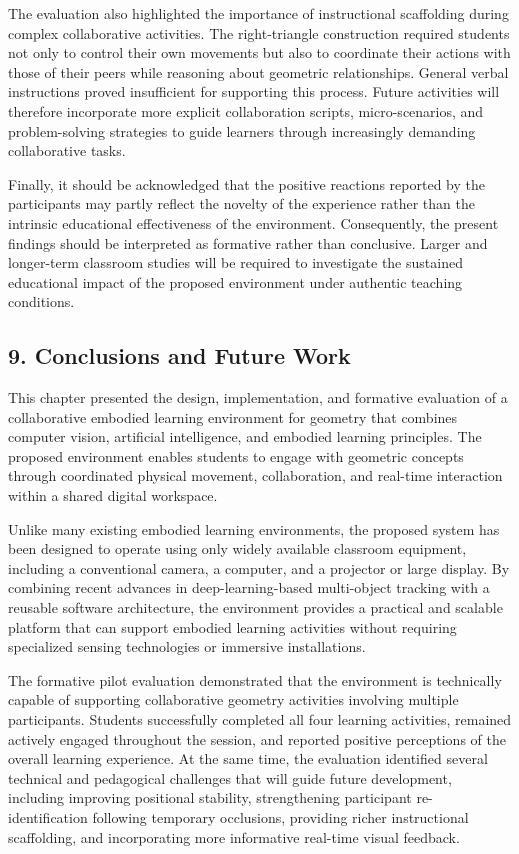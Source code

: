 The evaluation also highlighted the importance of instructional
scaffolding during complex collaborative activities. The right-triangle
construction required students not only to control their own movements
but also to coordinate their actions with those of their peers while
reasoning about geometric relationships. General verbal instructions
proved insufficient for supporting this process. Future activities will
therefore incorporate more explicit collaboration scripts,
micro-scenarios, and problem-solving strategies to guide learners
through increasingly demanding collaborative tasks.

Finally, it should be acknowledged that the positive reactions reported
by the participants may partly reflect the novelty of the experience
rather than the intrinsic educational effectiveness of the environment.
Consequently, the present findings should be interpreted as formative
rather than conclusive. Larger and longer-term classroom studies will be
required to investigate the sustained educational impact of the proposed
environment under authentic teaching conditions.

\subsection{9. Conclusions and Future
Work}\label{conclusions-and-future-work}

This chapter presented the design, implementation, and formative
evaluation of a collaborative embodied learning environment for geometry
that combines computer vision, artificial intelligence, and embodied
learning principles. The proposed environment enables students to engage
with geometric concepts through coordinated physical movement,
collaboration, and real-time interaction within a shared digital
workspace.

Unlike many existing embodied learning environments, the proposed system
has been designed to operate using only widely available classroom
equipment, including a conventional camera, a computer, and a projector
or large display. By combining recent advances in deep-learning-based
multi-object tracking with a reusable software architecture, the
environment provides a practical and scalable platform that can support
embodied learning activities without requiring specialized sensing
technologies or immersive installations.

The formative pilot evaluation demonstrated that the environment is
technically capable of supporting collaborative geometry activities
involving multiple participants. Students successfully completed all
four learning activities, remained actively engaged throughout the
session, and reported positive perceptions of the overall learning
experience. At the same time, the evaluation identified several
technical and pedagogical challenges that will guide future development,
including improving positional stability, strengthening participant
re-identification following temporary occlusions, providing richer
instructional scaffolding, and incorporating more informative real-time
visual feedback.


